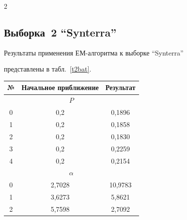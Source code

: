 \begin{multicols}{2}
\subsection{Выборка~2 ``Synterra''} %





Результаты применения ЕМ-алгоритма к выборке ``Synterra''


представлены в табл.~\ref{t2bat}.


\begin{table}\small


\begin{minipage}[t]{76mm}


\begin{center}


 \vspace*{2ex}





\tabcolsep=8.7pt


\begin{tabular}{|c|c|c|}


\hline


№&Начальное приближение&Результат\\


\hline


\multicolumn{3}{|c|}{$P$}\\


\hline


0&0,2&0,1896\\


1&0,2&0,1858\\


2&0,2&0,1830\\


3&0,2&0,2259\\


4&0,2&0,2154\\


\hline


\multicolumn{3}{|c|}{$\alpha$}\\


\hline


0&2,7028&10,9783\hphantom{9}\\


1&3,6273&5,8621 \\


2&5,7598&2,7092\\



\end{tabular}
\end{center}
\end{minipage}
\end{table}
\end{multicols}
